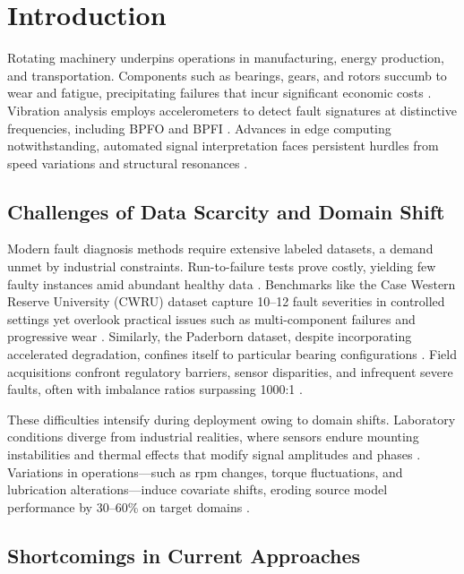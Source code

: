 \section{Introduction}

Rotating machinery underpins operations in manufacturing, energy production, and transportation. Components such as bearings, gears, and rotors succumb to wear and fatigue, precipitating failures that incur significant economic costs \cite{cite1}\cite{cite22}. Vibration analysis employs accelerometers to detect fault signatures at distinctive frequencies, including BPFO and BPFI \cite{cite2}\cite{cite3}. Advances in edge computing notwithstanding, automated signal interpretation faces persistent hurdles from speed variations and structural resonances \cite{cite4}.

\subsection{Challenges of Data Scarcity and Domain Shift}

Modern fault diagnosis methods require extensive labeled datasets, a demand unmet by industrial constraints. Run-to-failure tests prove costly, yielding few faulty instances amid abundant healthy data \cite{cite5}. Benchmarks like the Case Western Reserve University (CWRU) dataset capture 10--12 fault severities in controlled settings yet overlook practical issues such as multi-component failures and progressive wear \cite{cite6}. Similarly, the Paderborn dataset, despite incorporating accelerated degradation, confines itself to particular bearing configurations \cite{cite7}. Field acquisitions confront regulatory barriers, sensor disparities, and infrequent severe faults, often with imbalance ratios surpassing 1000:1 \cite{cite8}.

These difficulties intensify during deployment owing to domain shifts. Laboratory conditions diverge from industrial realities, where sensors endure mounting instabilities and thermal effects that modify signal amplitudes and phases \cite{cite25}. Variations in operations---such as rpm changes, torque fluctuations, and lubrication alterations---induce covariate shifts, eroding source model performance by 30--60\% on target domains \cite{cite9}\cite{cite26}.

\subsection{Shortcomings in Current Approaches}

